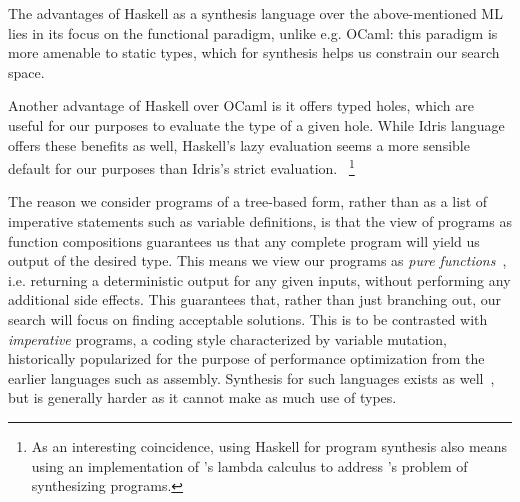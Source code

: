 \documentclass{article}
\begin{document}
The advantages of Haskell as a synthesis language over the above-mentioned ML lies in its focus on the functional paradigm,
unlike e.g. OCaml: this paradigm is more amenable to static types, which for synthesis helps us constrain our search space.

Another advantage of Haskell over OCaml is it offers typed holes, which are useful for our purposes to evaluate the type of a given hole.
While Idris language offers these benefits as well, Haskell's lazy evaluation seems a more sensible default for our purposes than Idris's strict evaluation.
~\footnote{As an interesting coincidence, using Haskell for program synthesis also means using an implementation of \citet{lambdacalculus}'s lambda calculus to address \citet{church1957applications}'s problem of synthesizing programs.}

The reason we consider programs of a tree-based form, rather than as a list of imperative statements such as variable definitions,
is that the view of programs as function compositions guarantees us that any complete program will yield us output of the desired type.
This means we view our programs as \emph{pure functions}~\citep{fortran95},
i.e. returning a deterministic output for any given inputs, without performing any additional side effects.
This guarantees that, rather than just branching out, our search will focus on finding acceptable solutions.
This is to be contrasted with \emph{imperative} programs, a coding style characterized by variable mutation,
historically popularized for the purpose of performance optimization from the earlier languages such as assembly.
Synthesis for such languages exists as well~\citep{shi2019frangel}, but is generally harder as it cannot make as much use of types.
\end{document}
